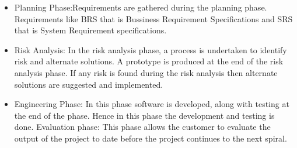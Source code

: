 \begin{itemize}
\item Planning Phase:\newline Requirements are gathered during the planning phase. Requirements like
BRS that is Bussiness Requirement Specifications and SRS that is System Requirement
specifications.
\item Risk Analysis: \newline
In the risk analysis phase, a process is undertaken to identify risk and alternate
solutions. A prototype is produced at the end of the risk analysis phase. If any risk is found
during the risk analysis then alternate solutions are suggested and implemented.
\item Engineering Phase: \newline
In this phase software is developed, along with testing at the end of the
phase. Hence in this phase the development and testing is done. Evaluation phase: This
phase allows the customer to evaluate the output of the project to date before the project
continues to the next spiral.
\end{itemize}



